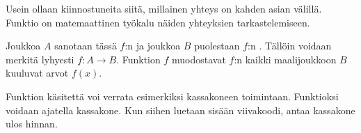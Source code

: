 Usein ollaan kiinnostuneita siitä, millainen yhteys on kahden asian välillä.
Funktio on matemaattinen työkalu näiden yhteyksien tarkastelemiseen.

  
Joukkoa $A$ sanotaan tässä $f$:n  ja joukkoa $B$ puolestaan $f$:n . Tällöin voidaan merkitä lyhyesti $f\colon A \to B$. Funktion $f$  muodostavat $f$:n kaikki maalijoukkoon $B$ kuuluvat arvot $f(x)$.
   
  
Funktion käsitettä voi verrata esimerkiksi kassakoneen toimintaan. Funktioksi voidaan ajatella kassakone. Kun siihen luetaan sisään viivakoodi, antaa kassakone ulos hinnan.

